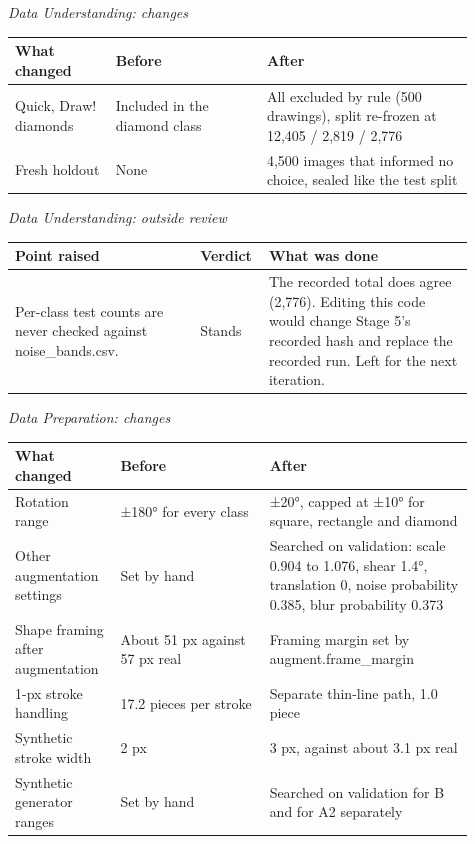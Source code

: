 \textit{Data Understanding: changes}

\begin{tabular}{p{0.20\linewidth}p{0.30\linewidth}p{0.41\linewidth}}
\toprule
What changed & Before & After \\
\midrule
Quick, Draw! diamonds & Included in the diamond class & All excluded by rule (500 drawings), split re-frozen at 12,405 / 2,819 / 2,776 \\
Fresh holdout & None & 4,500 images that informed no choice, sealed like the test split \\
\bottomrule
\end{tabular}

\medskip

\textit{Data Understanding: outside review}

\begin{tabular}{p{0.38\linewidth}p{0.11\linewidth}p{0.42\linewidth}}
\toprule
Point raised & Verdict & What was done \\
\midrule
Per-class test counts are never checked against noise\_bands.csv. & Stands & The recorded total does agree (2,776). Editing this code would change Stage 5's recorded hash and replace the recorded run. Left for the next iteration. \\
\bottomrule
\end{tabular}

\medskip

\textit{Data Preparation: changes}

\begin{tabular}{p{0.20\linewidth}p{0.30\linewidth}p{0.41\linewidth}}
\toprule
What changed & Before & After \\
\midrule
Rotation range & ±180° for every class & ±20°, capped at ±10° for square, rectangle and diamond \\
Other augmentation settings & Set by hand & Searched on validation: scale 0.904 to 1.076, shear 1.4°, translation 0, noise probability 0.385, blur probability 0.373 \\
Shape framing after augmentation & About 51 px against 57 px real & Framing margin set by augment.frame\_margin \\
1-px stroke handling & 17.2 pieces per stroke & Separate thin-line path, 1.0 piece \\
Synthetic stroke width & 2 px & 3 px, against about 3.1 px real \\
Synthetic generator ranges & Set by hand & Searched on validation for B and for A2 separately \\
\bottomrule
\end{tabular}

